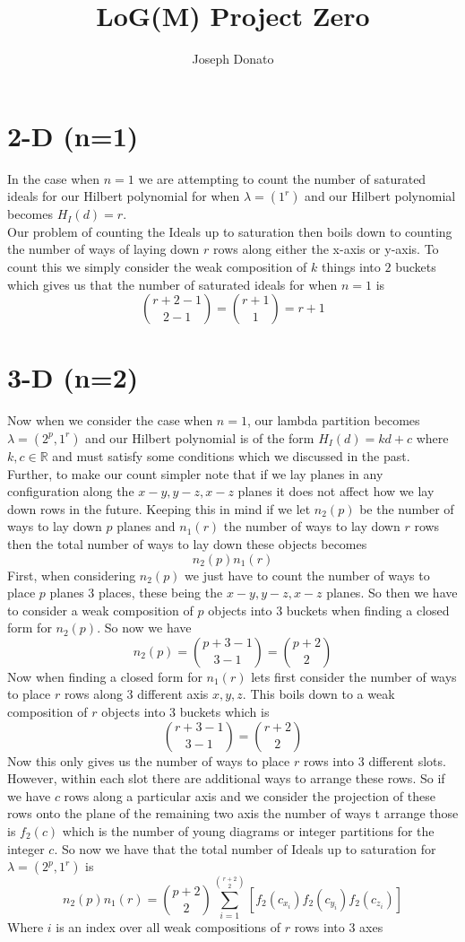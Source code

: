 \documentclass[11pt]{amsart} %
\title{LoG(M) Project Zero}
\author{Joseph Donato}
\theoremstyle{plain} %
\theoremstyle{definition} %
\begin{document}

\maketitle

\section*{2-D (n=1)}
In the case when $n=1$ we are attempting to count the number of saturated ideals for our Hilbert polynomial for when $\lambda=(1^{r})$ and our Hilbert polynomial becomes $H_{I}(d)=r$.\\
Our problem of counting the Ideals up to saturation then boils down to counting the number of ways of laying down $r$ rows along either the x-axis or y-axis.  To count this we simply consider the weak composition of $k$ things into $2$ buckets which gives us that the number of saturated ideals for when $n=1$ is 
$$\binom{r+2-1}{2-1}=\binom{r+1}{1}=r+1$$

\section*{3-D (n=2)}
Now when we consider the case when $n=1$, our lambda partition becomes $\lambda=(2^{p},1^{r})$ and our Hilbert polynomial is of the form $H_{I}(d)=kd+c$ where $k,c\in\mathbb{R}$ and must satisfy some conditions which we discussed in the past.  Further, to make our count simpler note that if we lay planes in any configuration along the $x-y,y-z,x-z$ planes it does not affect how we lay down rows in the future.  Keeping this in mind if we let $n_{2}(p)$ be the number of ways to lay down $p$ planes and $n_{1}(r)$ the number of ways to lay down $r$ rows then the total number of ways to lay down these objects becomes
$$n_{2}(p)n_{1}(r)$$
First, when considering $n_{2}(p)$ we just have to count the number of ways to place $p$ planes 3 places, these being the $x-y,y-z,x-z$ planes.  So then we have to consider a weak composition of $p$ objects into 3 buckets when finding a closed form for $n_{2}(p)$.  So now we have
$$n_{2}(p)=\binom{p+3-1}{3-1}=\binom{p+2}{2}$$
Now when finding a closed form for $n_{1}(r)$ lets first consider the number of ways to place $r$ rows along 3 different axis $x,y,z$.  This boils down to a weak composition of $r$ objects into 3 buckets which is
$$\binom{r+3-1}{3-1}=\binom{r+2}{2}$$
Now this only gives us the number of ways to place $r$ rows into 3 different slots.  However, within each slot there are additional ways to arrange these rows.  So if we have $c$ rows along a particular axis and we consider the projection of these rows onto the plane of the remaining two axis the number of ways t arrange those is $f_{2}(c)$ which is the number of young diagrams or integer partitions for the integer $c$.  So now we have that the total number of Ideals up to saturation for $\lambda=(2^{p},1^{r})$ is 
$$n_{2}(p)n_{1}(r)=\binom{p+2}{2}\sum_{i=1}^{\binom{r+2}{2}}\left[f_{2}(c_{x_{i}})f_{2}(c_{y_{i}})f_{2}(c_{z_{i}})\right]$$
Where $i$ is an index over all weak compositions of $r$ rows into 3 axes
\end{document}

